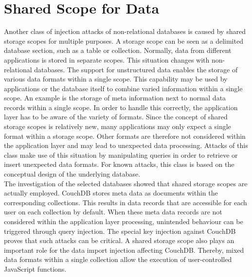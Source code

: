 \section{Shared Scope for Data}
Another class of injection attacks of non-relational databases is caused by shared storage scopes for multiple purposes. A storage scope can be seen as a delimited database section, such as a table or collection. Normally, data from different applications is stored in separate scopes. This situation changes with non-relational databases. The support for unstructured data enables the storage of various data formats within a single scope. This capability may be used by applications or the database itself to combine varied information within a single scope. An example is the storage of meta information next to normal data records within a single scope. In order to handle this correctly, the application layer has to be aware of the variety of formats. Since the concept of shared storage scopes is relatively new, many applications may only expect a single format within a storage scope. Other formats are therefore not considered within the application layer and may lead to unexpected data processing. Attacks of this class make use of this situation by manipulating queries in order to retrieve or insert unexpected data formats. For known attacks, this class is based on the conceptual design of the underlying database. \\

The investigation of the selected databases showed that shared storage scopes are actually employed. CouchDB stores meta data as documents within the corresponding collections. This results in data records that are accessible for each user on each collection by default. When these meta data records are not considered within the application layer processing, unintended behaviour can be triggered through query injection. The special key injection against CouchDB proves that such attacks can be critical. A shared storage scope also plays an important role for the data import injection affecting CouchDB. Thereby, mixed data formats within a single collection allow the execution of user-controlled JavaScript functions.

